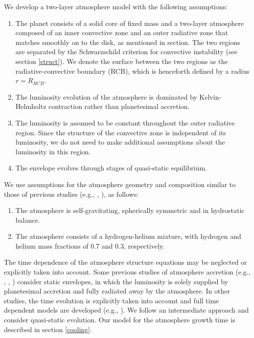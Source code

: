 \documentclass[apj]{emulateapj}
\begin{document}
We develop a two-layer atmosphere model with the following assumptions:

\begin{enumerate}
\item The planet consists of a solid core of fixed mass and a two-layer atmosphere composed of an inner convective zone and an outer radiative zone that matches smoothly on to the disk, as mentioned in section. The two regions are separated by the Schwarzschild criterion for convective instability (see section \ref{struct}). We denote the surface between the two regions as the radiative-convective boundary (RCB), which is henceforth defined by a radius $r=R_{RCB}$.
\item The luminosity evolution of the atmosphere is dominated by Kelvin-Helmholtz contraction rather than planetesimal accretion. 
\item The luminosity is assumed to be constant throughout the outer radiative region. Since the structure of the convective zone is independent of its luminosity, we do not need to make additional assumptions about the luminosity in this region.
\item The envelope evolves through stages of quasi-static equilibrium.
\end{enumerate} 

We use assumptions for the atmosphere geometry and composition similar to those of previous studies (e.g., \citealt{ikoma00}, \citealt{pn05}), as follows:

\begin{enumerate}
\item The atmosphere is self-gravitating, spherically symmetric and in hydrostatic balance.
\item The atmosphere consists of a hydrogen-helium mixture, with hydrogen and helium mass fractions of 0.7 and 0.3, respectively.
\end{enumerate}

The time dependence of the atmosphere structure equations may be neglected or explicitly taken into account. Some previous studies of atmosphere accretion (e.g., \citealt{stevenson82}, \citealt{wuchterl93}, \citealt{rafikov06}) consider static envelopes, in which the luminosity is solely supplied by planetesimal accretion and fully radiated away by the atmosphere. In other studies, the time evolution is explicitly taken into account and full time dependent models are developed (e.g., \citealt{ikoma00}). We follow an intermediate approach and consider quasi-static evolution. Our model for the atmosphere growth time is described in section \ref{cooling}. 
\end{document}
